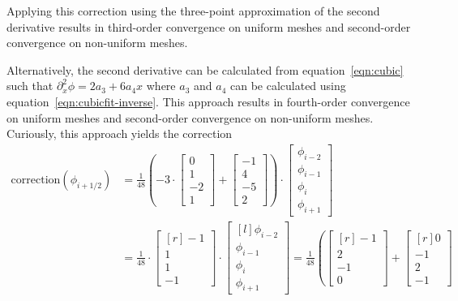 \documentclass{article}
\begin{document}
Applying this correction using the three-point approximation of the second derivative results in third-order convergence on uniform meshes and second-order convergence on non-uniform meshes.

Alternatively, the second derivative can be calculated from equation~\eqref{eqn:cubic} such that $\partial_x^2 \phi = 2a_3 + 6a_4x$ where $a_3$ and $a_4$ can be calculated using equation~\eqref{eqn:cubicfit-inverse}.  This approach results in fourth-order convergence on uniform meshes and second-order convergence on non-uniform meshes.
Curiously, this approach yields the correction
\begin{align}
	\mathrm{correction}(\phi_{i+1/2})
	&=
	\frac{1}{48}
	\left(
	-3
	\cdot
	\begin{bmatrix}
		0 \\ 1 \\ -2 \\ 1
	\end{bmatrix}
	+
	\begin{bmatrix}
		-1 \\ 4 \\ -5 \\ 2
	\end{bmatrix}
	\right)
	\cdot
	\begin{bmatrix}
		\phi_{i-2} \\
		\phi_{i-1} \\
		\phi_i \\
		\phi_{i+1}
	\end{bmatrix} \\
	&=
	\frac{1}{48}
	\cdot
	\begin{bmatrix*}[r]
		-1 \\ 1 \\ 1 \\ -1
	\end{bmatrix*}
	\cdot
	\begin{bmatrix*}[l]
		\phi_{i-2} \\
		\phi_{i-1} \\
		\phi_i \\
		\phi_{i+1}
	\end{bmatrix*}
	=
	\frac{1}{48}
	\left(
	\begin{bmatrix*}[r]
		-1 \\ 2 \\ -1 \\ 0
	\end{bmatrix*}
	+
	\begin{bmatrix*}[r]
		0 \\ -1 \\ 2 \\ -1

\end{bmatrix*}
\end{align}
\end{document}
